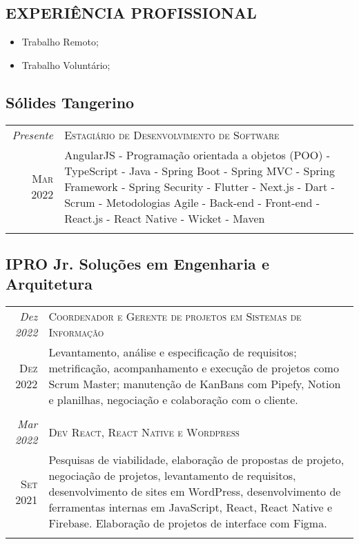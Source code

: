 \begin{framed}
\section{EXPERIÊNCIA PROFISSIONAL}
\begin{itemize}
  \item Trabalho Remoto;
  \item Trabalho Voluntário;

\end{itemize}

\subsection{  Sólides Tangerino}

\begin{tabular}{r|p{15cm}}
\emph{Presente}   & \textsc{Estagiário de Desenvolvimento de Software} \\
\textsc{Mar 2022} & \footnotesize{AngularJS - Programação orientada a objetos (POO) - TypeScript - Java - Spring Boot - Spring MVC - Spring Framework - Spring Security - Flutter - Next.js - Dart - Scrum - Metodologias Agile - Back-end - Front-end - React.js - React Native - Wicket - Maven}\\
\multicolumn{2}{c}{}
\end{tabular}


\subsection{  IPRO Jr. Soluções em Engenharia e Arquitetura}

\begin{tabular}{r|p{15cm}}
\emph{Dez 2022}   & \textsc{Coordenador e Gerente de projetos em Sistemas de Informação }\\
\textsc{Dez 2022} & \footnotesize{Levantamento, análise e especificação de requisitos; metrificação, acompanhamento e execução de projetos como Scrum Master; manutenção de KanBans com Pipefy, Notion e planilhas, negociação e colaboração com o cliente.}\\
\multicolumn{2}{c}{}\\

\emph{Mar 2022}   & \textsc{Dev React, React Native e Wordpress }   \\
\textsc{Set 2021} & \footnotesize{Pesquisas de viabilidade, elaboração de propostas de projeto, negociação de projetos, levantamento de requisitos, desenvolvimento de sites em WordPress, desenvolvimento de ferramentas internas em JavaScript, React, React Native e Firebase. Elaboração de projetos de interface com Figma.} \\
\multicolumn{2}{c}{} \\


\end{tabular}
\end{framed}
